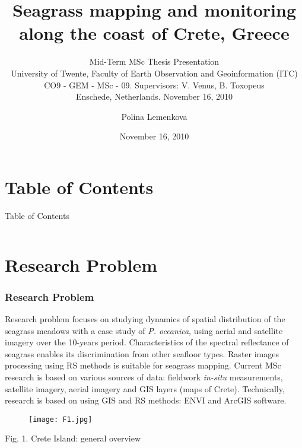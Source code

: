 \documentclass[pdflatex,compress]{beamer}
\title[Mid-Term Seagrass mapping and monitoring along the coast of Crete, Greece 11/2010]{Seagrass mapping and monitoring along the coast of Crete, Greece}
\subtitle{Mid-Term MSc Thesis Presentation\\
\footnotesize{University of Twente, Faculty of Earth Observation and Geoinformation (ITC)\\
CO9 - GEM - MSc - 09. Supervisors: V. Venus, B. Toxopeus\\
Enschede, Netherlands. November 16, 2010}}
\date{November 16, 2010}
\author{Polina Lemenkova}
\begin{document}
\maketitle

\section*{Table of Contents}
\begin{frame}{Table of Contents}
    \begin{columns}[onlytextwidth,T]
        \begin{column}{.45\textwidth}
            \tiny{\tableofcontents[sections=1-5]}
        \end{column}
        \begin{column}{.45\textwidth}
            \tiny{\tableofcontents[sections=6-13]}
        \end{column}
    \end{columns}
\end{frame}

\section{Research Problem}
\begin{frame}\frametitle{Research Problem}
\footnotesize{Research problem focuses on studying dynamics of spatial distribution of the seagrass meadows with a  case study of \emph{P. oceanica}, using aerial and satellite imagery over the 10-years period. Characteristics of the spectral reflectance of seagrass enables its discrimination from other seafloor types. Raster images processing using RS methods is suitable for seagrass mapping. Current MSc research is based on various sources of data: fieldwork \emph{in-situ} measurements, satellite imagery, aerial imagery and GIS layers (maps of Crete). Technically, research is based on using GIS and RS methods: ENVI and ArcGIS software.}
\begin{figure}[H]
	\centering
		\texttt{[image: F1.jpg]}
\end{figure}
\small{Fig. 1. Crete Island: general overview}
\end{frame}
\end{document}
